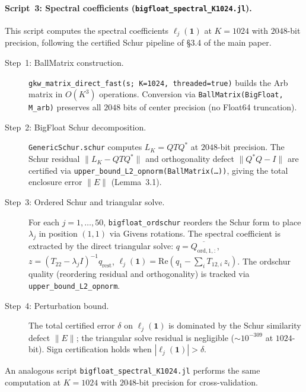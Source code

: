\documentclass[11pt]{article}
\begin{document}
\paragraph{Script~3: Spectral coefficients (\texttt{bigfloat\_spectral\_K1024.jl}).}
This script computes the spectral coefficients $\ell_j(\mathbf{1})$
at $K = 1024$ with $2048$-bit precision, following the certified Schur
pipeline of \S3.4 of the main paper.

\begin{description}
\item[Step~1: BallMatrix construction.]
  \texttt{gkw\_matrix\_direct\_fast(s; K=1024, threaded=true)} builds
  the Arb matrix in $O(K^3)$ operations.
  Conversion via \texttt{BallMatrix(BigFloat, M\_arb)}
  preserves all $2048$ bits of center precision
  (no Float64 truncation).

\item[Step~2: BigFloat Schur decomposition.]
  \texttt{GenericSchur.schur} computes $L_K = QTQ^*$ at $2048$-bit precision.
  The Schur residual $\|L_K - QTQ^*\|$ and orthogonality defect
  $\|Q^*Q - I\|$ are certified via
  \texttt{upper\_bound\_L2\_opnorm(BallMatrix(\ldots))},
  giving the total enclosure error $\|E\|$
  (Lemma~3.1).

\item[Step~3: Ordered Schur and triangular solve.]
  For each $j = 1, \ldots, 50$, \texttt{bigfloat\_ordschur}
  reorders the Schur form to place $\lambda_j$ in position $(1,1)$
  via Givens rotations.
  The spectral coefficient is extracted by the direct triangular solve:
  $q = \overline{Q_{\mathrm{ord},1,:}}$,\;
  $z = (T_{22} - \lambda_j I)^{-1} q_{\mathrm{rest}}$,\;
  $\ell_j(\mathbf{1}) = \mathrm{Re}(q_1 - \sum_i T_{12,i}\,z_i)$.
  The ordschur quality (reordering residual and orthogonality)
  is tracked via \texttt{upper\_bound\_L2\_opnorm}.

\item[Step~4: Perturbation bound.]
  The total certified error $\delta$ on $\ell_j(\mathbf{1})$
  is dominated by the Schur similarity defect $\|E\|$;
  the triangular solve residual is negligible
  ($\sim 10^{-309}$ at $1024$-bit).
  Sign certification holds when $|\ell_j(\mathbf{1})| > \delta$.
\end{description}

An analogous script \texttt{bigfloat\_spectral\_K1024.jl}
performs the same computation at $K = 1024$ with $2048$-bit precision
for cross-validation.
\end{document}

